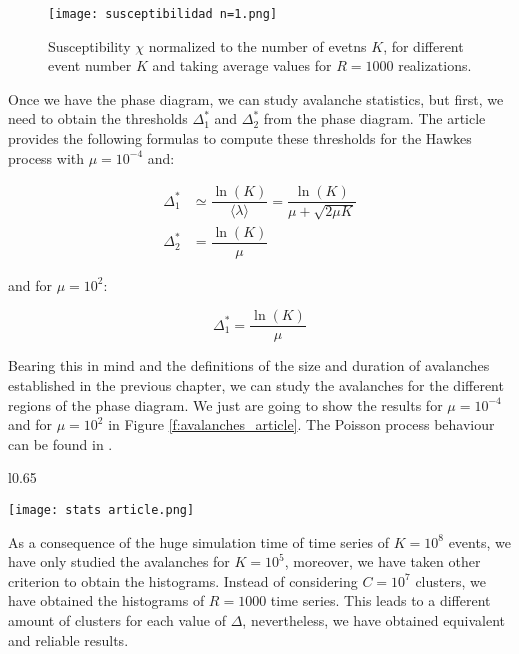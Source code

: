 \begin{figure}[H]
    \centering
    \texttt{[image: susceptibilidad n=1.png]}
    \caption{Susceptibility $\chi$ normalized to the number of evetns $K$, for different event number $K$ and taking average values for $R=1000$ realizations.}
    \label{f:susceptibilidad_article}   
\end{figure}

Once we have the phase diagram, we can study avalanche statistics, but first, we need to obtain the thresholds $\Delta_1^*$ and $\Delta_2^*$ from the phase diagram. 
The article \cite{notarmuzi2021percolation} provides the following formulas to compute these thresholds for the Hawkes process with $\mu=10^{-4}$ and:

\begin{align}
    \Delta_1^* &\simeq \dfrac{\ln(K)}{\langle \lambda \rangle}= \dfrac{\ln(K)}{\mu+\sqrt{2\mu K}} \label{eq:Ecuación delta1 *} \\
    \Delta_2^* &= \dfrac{\ln(K)}{\mu}\label{eq:Ecuación delta2 *}
\end{align}

and for $\mu=10^2$:

\begin{equation}
    \Delta_1^* = \dfrac{\ln(K)}{\mu}
\end{equation}

Bearing this in mind and the definitions of the size and duration of avalanches established in the previous chapter, we can study the avalanches for the different regions
of the phase diagram. We just are going to show the results for $\mu=10^{-4}$ and for $\mu=10^2$ in Figure \ref{f:avalanches_article}. The Poisson process behaviour can be found in 
\cite{stauffer2018introduction, stauffer1978critical}. 


\begin{wrapfigure}{l}{0.65\textwidth}
    \begin{center}
      \texttt{[image: stats article.png]}
    \end{center}
    \caption{Avalanche analysis for Hawkes process with $n=1$, $K=10^5$ events averaged over $R=1000$ realizations.}
    \label{f:avalanches_article}
\end{wrapfigure}

As a consequence of the huge simulation time of time series of $K=10^8$ events, we have only studied the avalanches for $K=10^5$, moreover, we have taken other criterion to obtain the 
histograms. Instead of considering $C=10^7$ clusters, we have obtained the histograms of $R=1000$ time series. This leads to a different amount of clusters for each value of $\Delta$, 
nevertheless, we have obtained equivalent and reliable results.  

